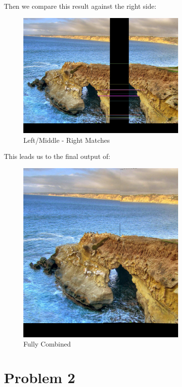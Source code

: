 \documentclass{article}
\begin{document}
Then we compare this result against the right side:

\begin{figure}[H]
    \centering
    \includegraphics[width = 0.75\textwidth]{imgs/left_middle_match_right.png}
    \caption{Left/Middle - Right Matches}
    \label{fig:prob1-d-leftmiddle-right-matches}
\end{figure}

This leads us to the final output of:

\begin{figure}[H]
    \centering
    \includegraphics[width = 0.75\textwidth]{imgs/combined_full.png}
    \caption{Fully Combined}
    \label{fig:prob1-d-full-combined}
\end{figure}

\section*{Problem 2}
\end{document}
